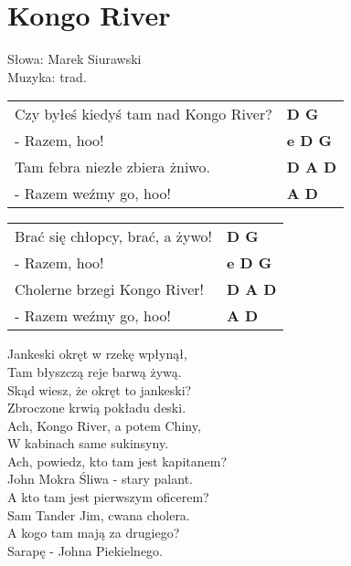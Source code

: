 \section{Kongo River}

Słowa: Marek Siurawski\\
Muzyka: trad.

\vspace{2em}
\begin{tabular}{@{}p{7cm}@{}l@{}}
Czy byłeś kiedyś tam nad Kongo River? & \bfseries D G\\
- Razem, hoo! & \bfseries e D G\\
Tam febra niezłe zbiera żniwo. & \bfseries D A D\\
- Razem weźmy go, hoo! & \bfseries A D\\
\end{tabular}

\vspace{1em}
\begin{tabular}{@{}p{7cm}@{}l@{}}
Brać się chłopcy, brać, a żywo! & \bfseries D G\\
- Razem, hoo! & \bfseries e D G\\
Cholerne brzegi Kongo River! & \bfseries D A D\\
- Razem weźmy go, hoo! & \bfseries A D\\
\end{tabular}

\vspace{1em}
Jankeski okręt w rzekę wpłynął, \\
Tam błyszczą reje barwą żywą. \\

Skąd wiesz, że okręt to jankeski? \\
Zbroczone krwią pokładu deski. \\

Ach, Kongo River, a potem Chiny, \\
W kabinach same sukinsyny. \\

Ach, powiedz, kto tam jest kapitanem? \\
John Mokra Śliwa - stary palant. \\

A kto tam jest pierwszym oficerem? \\
Sam Tander Jim, cwana cholera. \\

A kogo tam mają za drugiego? \\
Sarapę - Johna Piekielnego. \\

